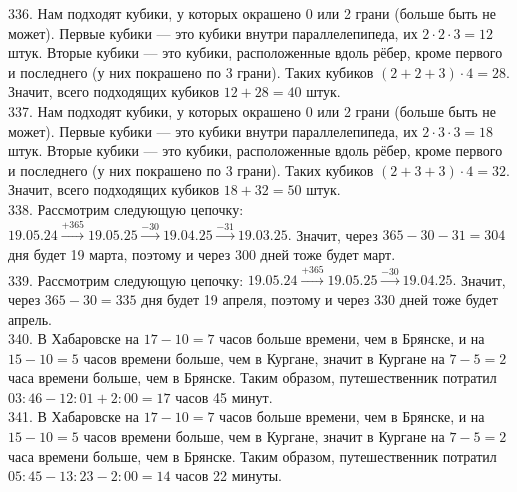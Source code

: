 \documentclass[12pt]{article}
\begin{document}
336. Нам подходят кубики, у которых окрашено 0 или 2 грани (больше быть не может). Первые кубики --- это кубики внутри параллелепипеда, их $2\cdot2\cdot3=12$ штук. Вторые кубики --- это кубики, расположенные вдоль рёбер, кроме первого и последнего (у них покрашено по 3 грани). Таких кубиков $(2+2+3)\cdot4=28.$ Значит, всего подходящих кубиков $12+28=40$ штук.\\
337. Нам подходят кубики, у которых окрашено 0 или 2 грани (больше быть не может). Первые кубики --- это кубики внутри параллелепипеда, их $2\cdot3\cdot3=18$ штук. Вторые кубики --- это кубики, расположенные вдоль рёбер, кроме первого и последнего (у них покрашено по 3 грани). Таких кубиков $(2+3+3)\cdot4=32.$ Значит, всего подходящих кубиков $18+32=50$ штук.\\
338. Рассмотрим следующую цепочку: $19.05.24\stackrel{+365}{\rightarrow}19.05.25\stackrel{-30}{\rightarrow}19.04.25
\stackrel{-31}{\rightarrow}19.03.25.$ Значит, через $365-30-31=304$ дня будет 19 марта, поэтому и через 300 дней тоже будет март.\\
339. Рассмотрим следующую цепочку: $19.05.24\stackrel{+365}{\rightarrow}19.05.25\stackrel{-30}{\rightarrow}19.04.25.$ Значит, через $365-30=335$ дня будет 19 апреля, поэтому и через 330 дней тоже будет апрель.\\
340. В Хабаровске на $17-10=7$ часов больше времени, чем в Брянске, и на $15-10=5$ часов времени больше, чем в Кургане, значит в Кургане на $7-5=2$ часа времени больше, чем в Брянске. Таким образом, путешественник потратил
$03:46-12:01+2:00=17$ часов 45 минут.\\
341. В Хабаровске на $17-10=7$ часов больше времени, чем в Брянске, и на $15-10=5$ часов времени больше, чем в Кургане, значит в Кургане на $7-5=2$ часа времени больше, чем в Брянске. Таким образом, путешественник потратил
$05:45-13:23-2:00=14$ часов 22 минуты.
\newpage
\end{document}
